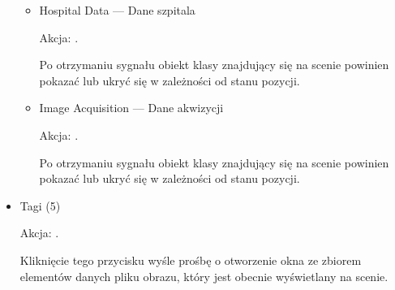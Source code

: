 \begin{itemize}
\begin{itemize}
              \item Hospital Data --- Dane szpitala

                    Akcja: .

                    Po otrzymaniu sygnału obiekt klasy  znajdujący się na scenie powinien pokazać lub ukryć się w zależności od stanu pozycji.
              \item Image Acquisition --- Dane akwizycji

                    Akcja: .

                    Po otrzymaniu sygnału obiekt klasy  znajdujący się na scenie powinien pokazać lub ukryć się w zależności od stanu pozycji.

          \end{itemize}

    \item Tagi (5)

          Akcja: .

          Kliknięcie tego przycisku wyśle prośbę o otworzenie okna ze zbiorem elementów danych pliku obrazu, który jest obecnie wyświetlany na scenie.

\end{itemize}